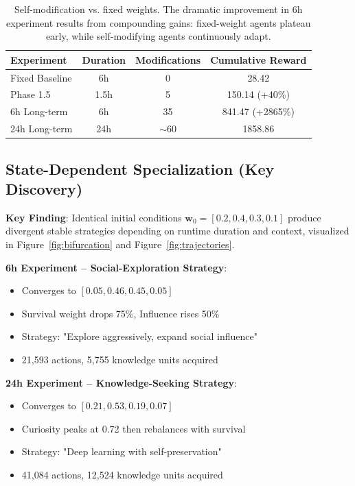 \documentclass{article}
\begin{document}
\begin{table}[h]
\centering
\begin{tabular}{lccc}
\toprule
Experiment & Duration & Modifications & Cumulative Reward \\
\midrule
Fixed Baseline & 6h & 0 & 28.42 \\
Phase 1.5 & 1.5h & 5 & 150.14 (+40\%) \\
6h Long-term & 6h & 35 & 841.47 (+2865\%) \\
24h Long-term & 24h & $\sim$60 & 1858.86 \\
\bottomrule
\end{tabular}
\caption{Self-modification vs. fixed weights. The dramatic improvement in 6h experiment results from compounding gains: fixed-weight agents plateau early, while self-modifying agents continuously adapt.}
\label{tab:performance}
\end{table}

\subsection{State-Dependent Specialization (Key Discovery)}
\textbf{Key Finding}: Identical initial conditions $\mathbf{w}_0 = [0.2, 0.4, 0.3, 0.1]$ produce divergent stable strategies depending on runtime duration and context, visualized in Figure~\ref{fig:bifurcation} and Figure~\ref{fig:trajectories}.

\textbf{6h Experiment -- Social-Exploration Strategy}:
\begin{itemize}
\item Converges to $[0.05, 0.46, 0.45, 0.05]$
\item Survival weight drops 75\%, Influence rises 50\%
\item Strategy: "Explore aggressively, expand social influence"
\item 21,593 actions, 5,755 knowledge units acquired
\end{itemize}

\textbf{24h Experiment -- Knowledge-Seeking Strategy}:
\begin{itemize}
\item Converges to $[0.21, 0.53, 0.19, 0.07]$
\item Curiosity peaks at 0.72 then rebalances with survival
\item Strategy: "Deep learning with self-preservation"
\item 41,084 actions, 12,524 knowledge units acquired
\end{itemize}
\end{document}
